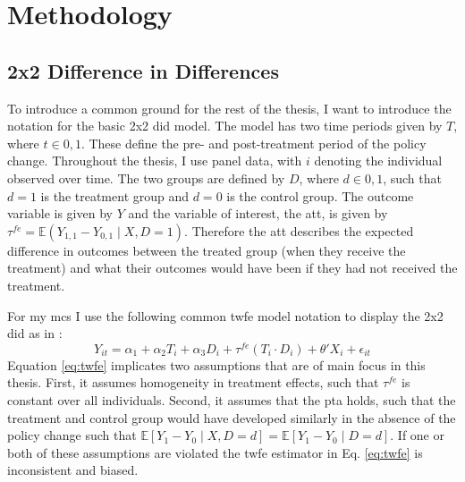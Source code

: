 \section{Methodology}




\subsection{2x2 Difference in Differences}
To introduce a common ground for the rest of the thesis, I want to introduce the notation for the basic 2x2 \ac{did} model.
The model has two time periods given by $T$, where $t \in 0, 1$.
These define the pre- and post-treatment period of the policy change.
Throughout the thesis, I use panel data, with $i$ denoting the individual observed over time.
The two groups are defined by $D$, where $d \in 0, 1$, such that $d = 1$ is the treatment group and $d = 0$ is the control group.
The outcome variable is given by $Y$ and the variable of interest, the \ac{att}, is given by $\tau^{fe} = \mathbb{E}(Y_{1,1} - Y_{0,1} \mid  X,D = 1)$.
Therefore the \ac{att} describes the expected difference in outcomes between the treated group (when they receive the treatment) and what their outcomes would have been if they had not received the treatment.

For my \ac{mcs} I use the following common \ac{twfe} model notation to display the 2x2 \ac{did} as in \citet{santannaDoublyRobustDifferenceindifferences2020}:
\begin{equation}
Y_{it} = \alpha_1 + \alpha_2 T_i + \alpha_3 D_i + \tau^{fe} (T_i \cdot D_i) + \theta' X_i + \epsilon_{it}
\label{eq:twfe}
\end{equation}
Equation \ref{eq:twfe} implicates two assumptions that are of main focus in this thesis.
First, it assumes homogeneity in treatment effects, such that $\tau^{fe}$ is constant over all individuals.
Second, it assumes that the \ac{pta} holds, such that the treatment and control group would have developed similarly in the absence of the policy change such that $\mathbb{E} [Y_1 - Y_0 \mid X, D = d] = \mathbb{E} [Y_1 - Y_0 \mid D = d]$.
If one or both of these assumptions are violated the \ac{twfe} estimator in Eq. \ref{eq:twfe} is inconsistent and biased.

